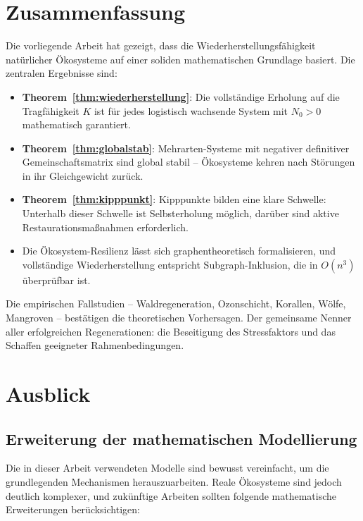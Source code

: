 ﻿\documentclass[a4paper,12pt]{article}
\theoremstyle{definition}
\begin{document}
\section{Zusammenfassung}

Die vorliegende Arbeit hat gezeigt, dass die Wiederherstellungsfähigkeit natürlicher Ökosysteme auf einer soliden mathematischen Grundlage basiert. Die zentralen Ergebnisse sind:

\begin{itemize}
	\item \textbf{Theorem~\ref{thm:wiederherstellung}}: Die vollständige Erholung auf die Tragfähigkeit $K$ ist für jedes logistisch wachsende System mit $N_0 > 0$ mathematisch garantiert.
	\item \textbf{Theorem~\ref{thm:globalstab}}: Mehrarten-Systeme mit negativer definitiver Gemeinschaftsmatrix sind global stabil -- Ökosysteme kehren nach Störungen in ihr Gleichgewicht zurück.
	\item \textbf{Theorem~\ref{thm:kipppunkt}}: Kipppunkte bilden eine klare Schwelle: Unterhalb dieser Schwelle ist Selbsterholung möglich, darüber sind aktive Restaurationsmaßnahmen erforderlich.
	\item Die Ökosystem-Resilienz lässt sich graphentheoretisch formalisieren, und vollständige Wiederherstellung entspricht Subgraph-Inklusion, die in $O(n^3)$ überprüfbar ist.
\end{itemize}

Die empirischen Fallstudien -- Waldregeneration, Ozonschicht, Korallen, Wölfe, Mangroven -- bestätigen die theoretischen Vorhersagen. Der gemeinsame Nenner aller erfolgreichen Regenerationen: die Beseitigung des Stressfaktors und das Schaffen geeigneter Rahmenbedingungen.

\section{Ausblick}
\label{sec:ausblick}

\subsection{Erweiterung der mathematischen Modellierung}

Die in dieser Arbeit verwendeten Modelle sind bewusst vereinfacht, um die grundlegenden Mechanismen herauszuarbeiten. Reale Ökosysteme sind jedoch deutlich komplexer, und zukünftige Arbeiten sollten folgende mathematische Erweiterungen berücksichtigen:
\end{document}
